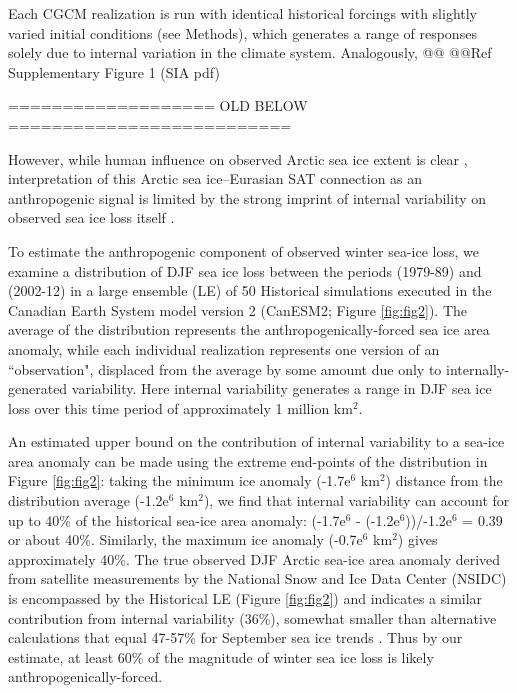 \documentclass{nature}
\begin{document}
Each CGCM realization is run with identical historical forcings with slightly varied initial conditions (see Methods), which generates a range of responses solely due to internal variation in the climate system. Analogously, @@
@@Ref Supplementary Figure 1 (SIA pdf)

 
 
 
 =================== OLD BELOW ==========================
 
 However, while human influence on observed Arctic sea ice extent is clear \cite{min08}, interpretation of this Arctic sea ice--Eurasian SAT connection as an anthropogenic signal is limited by the strong imprint of internal variability on observed sea ice loss itself \cite{swart15}. 

To estimate the anthropogenic component of observed winter sea-ice loss, we examine a distribution of DJF sea ice loss between the periods (1979-89) and (2002-12) in a large ensemble (LE) of 50 Historical simulations executed in the Canadian Earth System model version 2 (CanESM2; Figure \ref{fig:fig2}). The average of the distribution represents the anthropogenically-forced sea ice area anomaly, while each individual realization represents one version of an ``observation", displaced from the average by some amount due only to internally-generated variability. Here internal variability generates a range in DJF sea ice loss over this time period of approximately 1 million km$^2$. 

An estimated upper bound on the contribution of internal variability to a sea-ice area anomaly can be made using the extreme end-points of the distribution in Figure \ref{fig:fig2}: taking the minimum ice anomaly (-1.7e$^6$ km$^2$) distance from the distribution average (-1.2e$^6$ km$^2$), we find that internal variability can account for up to 40\% of the historical sea-ice area anomaly: (-1.7e$^6$ - (-1.2e$^6$))/-1.2e$^6$ = 0.39 or about 40\%. Similarly, the maximum ice anomaly (-0.7e$^6$ km$^2$) gives approximately 40\%. The true observed DJF Arctic sea-ice area anomaly derived from satellite measurements by the National Snow and Ice Data Center (NSIDC) is encompassed by the Historical LE (Figure \ref{fig:fig2}) and indicates a similar contribution from internal variability (36\%), somewhat smaller than alternative calculations that equal 47-57\% for September sea ice trends \cite{kay11,stroeve07}. Thus by our estimate, at least 60\% of the magnitude of winter sea ice loss is likely anthropogenically-forced. 
\end{document}
